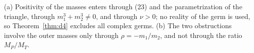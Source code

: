 \begin{remark}\label{rem:d4-witnesses}
(a) Positivity of the masses enters through (23) and the parametrization of the triangle,
through $m_1^3+m_2^3\ne0$, and through $\nu>0$; no reality of the germ is used, so
Theorem~\ref{thm:d4} excludes all complex germs.
(b) The two obstructions involve the outer masses only through $\rho=-m_1/m_2$, and not through
the ratio $M_P/M_T$.
\end{remark}
